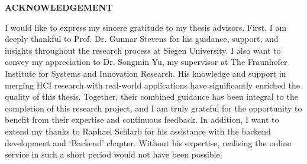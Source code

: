  \setcounter{page}{2}
\begin{center}
    {\Large{\bf{ACKNOWLEDGEMENT}}}
\end{center}

\noindent
I would like to express my sincere gratitude to my thesis advisors. 
First, I am deeply thankful to Prof. Dr. Gunnar Stevens for his guidance, support, and insights throughout the research process at Siegen University. 
I also want to convey my appreciation to Dr. Songmin Yu, my supervisor at The Fraunhofer Institute for Systems and Innovation Research. 
His knowledge and support in merging HCI research with real-world applications have significantly enriched the quality of this thesis.
Together, their combined guidance has been integral to the completion of this research project, and I am truly grateful for the opportunity to benefit from their expertise and continuous feedback. 
In addition, I want to extend my thanks to Raphael Schlarb for his assistance with the backend development and `Backend' chapter. 
Without his expertise, realising the online service in such a short period would not have been possible.
\clearpage